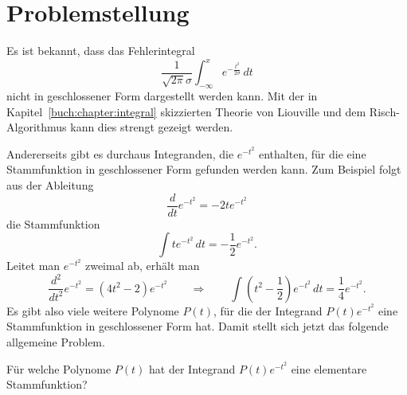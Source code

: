 %
%
%
\section{Problemstellung\label{dreieck:section:problemstellung}}
Es ist bekannt, dass das Fehlerintegral
\[
\frac{1}{\sqrt{2\pi}\sigma} \int_{-\infty}^x e^{-\frac{t^2}{2\sigma}}\,dt
\]
nicht in geschlossener Form dargestellt werden kann.
Mit der in Kapitel~\ref{buch:chapter:integral} skizzierten Theorie von
Liouville und dem Risch-Algorithmus kann dies strengt gezeigt werden.

Andererseits gibt es durchaus Integranden, die $e^{-t^2}$ enthalten,
für die eine Stammfunktion in geschlossener Form gefunden werden kann.
Zum Beispiel folgt aus der Ableitung
\[
\frac{d}{dt} e^{-t^2}
=
-2te^{-t^2}
\]
die Stammfunktion
\[
\int te^{-t^2}\,dt
=
-\frac12 e^{-t^2}.
\]
Leitet man $e^{-t^2}$ zweimal ab, erhält man
\[
\frac{d^2}{dt^2} e^{-t^2}
=
(4t^2-2) e^{-t^2}
\qquad\Rightarrow\qquad
\int (t^2-{\textstyle\frac12}) e^{-t^2}\,dt
=
{\textstyle\frac14}
e^{-t^2}.
\]
Es gibt also viele weitere Polynome $P(t)$, für die der Integrand
$P(t)e^{-t^2}$ eine Stammfunktion in geschlossener Form hat.
Damit stellt sich jetzt das folgende allgemeine Problem.

\begin{problem}
\label{dreieck:problem}
Für welche Polynome $P(t)$ hat der Integrand $P(t)e^{-t^2}$
eine elementare Stammfunktion?
\end{problem}

